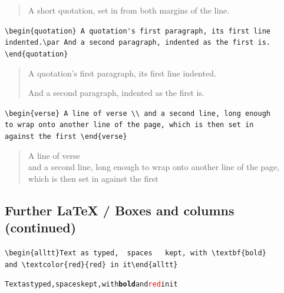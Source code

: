 \documentclass[9pt]{extarticle}
\begin{document}
\begin{quote} A short quotation, set in from both margins of the line. \end{quote}

{\small\verb|\begin{quotation} A quotation's first paragraph, its first line| \\ \verb|indented.\par And a second paragraph, indented as the first is.| \\ \verb|\end{quotation}|}

\begin{quotation} A quotation's first paragraph, its first line indented.\par And a second paragraph, indented as the first is. \end{quotation}

{\small\verb|\begin{verse} A line of verse \\ and a second line, long enough| \\ \verb|to wrap onto another line of the page, which is then set in| \\ \verb|against the first \end{verse}|}

\begin{verse} A line of verse \\ and a second line, long enough to wrap onto another line of the page, which is then set in against the first \end{verse}

\newpage
\subsection*{Further LaTeX / Boxes and columns (continued)}

{\small\verb|\begin{alltt}Text as typed,  spaces   kept, with \textbf{bold}| \\ \verb|and \textcolor{red}{red} in it\end{alltt}|}

\begin{alltt}Text as typed,  spaces   kept, with \textbf{bold} and \textcolor{red}{red} in it\end{alltt}
\end{document}
